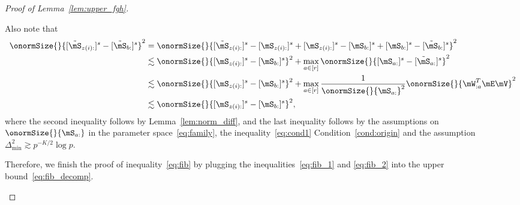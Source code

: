 \documentclass[lettersize,onecolumn,journal]{IEEEtran}
\theoremstyle{definition}
\theoremstyle{definition}
\begin{document}
\begin{proof}[Proof of Lemma~\ref{lem:upper_fgh}]
\begin{enumerate}
    Also note that 
    \begin{align}
        \onormSize{}{  [  \tilde \mS_{z(i):} ]^s - [  \tilde \mS_{b:} ]^s  }^2 &=  \onormSize{}{  [  \tilde \mS_{z(i):} ]^s -[ \mS_{z(i):} ]^s +  [ \mS_{z(i):} ]^s - [ \mS_{b:} ]^s + [ \mS_{b:} ]^s -[  \tilde \mS_{b:} ]^s  }^2 \\
        & \lesssim \onormSize{}{ [ \mS_{z(i):} ]^s - [ \mS_{b:} ]^s }^2 + \max_{a \in [r]} \onormSize{}{ [ \mS_{a:} ]^s -[  \tilde \mS_{a:} ]^s }^2 \\
        & \lesssim \onormSize{}{ [ \mS_{z(i):} ]^s - [ \mS_{b:} ]^s }^2  + \max_{a \in [r]} \frac{1}{\onormSize{}{\mS_{a:} }^2} \onormSize{}{ \mW_{:a}^T \mE \mV}^2\\
        & \lesssim \onormSize{}{ [ \mS_{z(i):} ]^s - [ \mS_{b:} ]^s }^2, \label{eq:fib_2}
    \end{align}
    where the second inequality follows by Lemma~\ref{lem:norm_diff}, and the last inequality follows by the assumptions on $\onormSize{}{\mS_{a:}}$ in the parameter space~\eqref{eq:family}, the inequality~\eqref{eq:cond1} Condition~\ref{cond:origin} and the assumption $\Delta_{\min}^2 \gtrsim p^{-K/2}\log p$. 
    
    Therefore, we finish the proof of inequality~\eqref{eq:fib} by plugging the inequalities~\eqref{eq:fib_1} and \eqref{eq:fib_2} into the upper bound~\eqref{eq:fib_decomp}.
    

\end{enumerate}
\end{proof}
\end{document}
